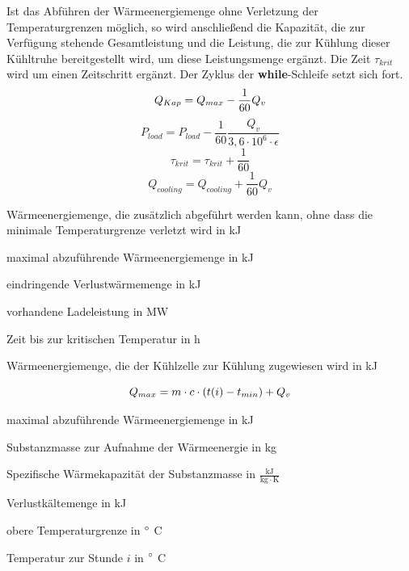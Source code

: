 \begin{description}
Ist das Abf\"uhren der W\"armeenergiemenge ohne Verletzung der Temperaturgrenzen
m\"oglich, so wird anschlie\ss end die Kapazit\"at, die zur Verf\"ugung
stehende Gesamtleistung und die Leistung, die zur K\"uhlung dieser K\"uhltruhe
bereitgestellt wird, um diese Leistungsmenge erg\"anzt. Die Zeit $\tau_{krit}$
wird um einen Zeitschritt erg\"anzt. Der Zyklus der \textbf{while}-Schleife
setzt sich fort.
\begin{equation*}
	Q_{Kap} = Q_{max} - \frac{1}{60}Q_v\\
\end{equation*}
\begin{equation*}
	P_{load} = P_{load} - \frac{1}{60}\frac{Q_v }{3,6 \cdot 10^{6} \cdot
	\epsilon}
\end{equation*}
\begin{equation*}
	\tau_{krit} = \tau_{krit} + \frac{1}{60}
\end{equation*}
\begin{equation*}
	Q_{cooling} = Q_{cooling} + \frac{1}{60}Q_v
\end{equation*}
\begin{description}[\dth]
\item[$Q_{Kap}$] W\"armeenergiemenge, die zus\"atzlich abgef\"uhrt werden kann,
ohne dass die minimale Temperaturgrenze verletzt wird in kJ
\item[$Q_{max}$] maximal abzuf\"uhrende W\"armeenergiemenge in kJ
\item[$Q_{v}$] eindringende Verlustw\"armemenge in kJ
\item[$P_{load}$] vorhandene Ladeleistung in MW
\item[$\tau_{krit}$] Zeit bis zur kritischen Temperatur in h
\item[$Q_{cooling}$] W\"armeenergiemenge, die der K\"uhlzelle zur K\"uhlung
zugewiesen wird in kJ
\end{description} \vspace{0.5cm}
\begin{equation}
	\emax = m \cdot c \cdot (t(i) - t_{min}) + Q_v
\label{emax}
\end{equation}

\begin{description}[\dth]

	\item[$\emax$] maximal abzuf\"uhrende W\"armeenergiemenge in kJ
	\item[$m$] Substanzmasse zur Aufnahme der Wärmeenergie in kg
	\item[$c$] Spezifische Wärmekapazität der Substanzmasse in $\mathrm{\frac{kJ}{kg
		\cdot K}}$
	\item[$Q_v$] Verlustk\"altemenge in kJ
	\item[$t_{min}$] obere Temperaturgrenze in  $^\circ$ C
	\item[$t(i)$] Temperatur zur Stunde $i$ in  $^\circ$ C

\end{description}
\vspace{0.5cm}

\end{description}

